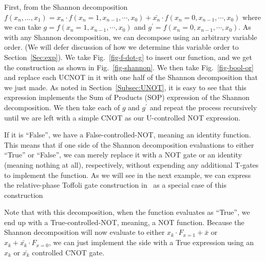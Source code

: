 First, from the Shannon decomposition $f(x_n,...,x_1) = x_n \cdot f(x_n=1,x_{n-1},\cdots,x_0) + \bar{x_n} \cdot f(x_n=0,x_{n-1},\cdots,x_0)$ where we can take $g=f(x_n=1,x_{n-1},\cdots,x_0)$ and $g^{\prime}=f(x_n=0,x_{n-1},\cdots,x_0)$. As with any Shannon decomposition, we can decompose using an arbitrary variable order. (We will defer discussion of how we determine this variable order to Section~\ref{Sec:exp}). We take Fig.~\ref{fig-f-dot-g} to insert our function, and we get the construction as shown in Fig.~\ref{fig-shannon}. We then take Fig.~\ref{fig-bool-or} and replace each UCNOT in it with one half of the Shannon decomposition that we just made. As noted in Section~\ref{Subsec:UNOT}, it is easy to see that this expression implements the Sum of Products (SOP) expression of the Shannon decomposition. We then take each of $g$ and $g^{\prime}$ and repeat the process recursively until we are left with a simple CNOT as our U-controlled NOT expression.

If it is ``False'', we have a False-controlled-NOT, meaning an identity function. This means that if one side of the Shannon decomposition evaluations to either ``True'' or ``False'', we can merely replace it with a NOT gate or an identity (meaning nothing at all), respectively, without expending any additional T-gates to implement the function. As we will see in the next example, we can express the relative-phase Toffoli gate construction in~\cite{bib-amy-phase-state} as a special case of this construction

Note that with this decomposition, when the function evaluates as ``True'', we end up with a True-controlled-NOT, meaning, a NOT function. Because the Shannon decomposition will now evaluate to either $x_k \cdot F_{x=1} + \bar{x}$ or $x_k + \bar{x_k} \cdot F_{x=0}$, we can just implement the side with a True expression using an $x_k$ or $\bar{x_k}$ controlled CNOT gate. 


